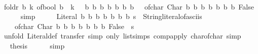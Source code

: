 \begin{isabellebody}
%
\isadelimproof
%
\endisadelimproof
%
\isatagproof
{}\isamarkupfalse%
\ {\isacharminus}{\kern0pt}\isanewline
\ \ \isamarkupfalse%
\ {\isacartoucheopen}foldr\ {\isacharparenleft}{\kern0pt}{\isasymlambda}b\ k{\isachardot}{\kern0pt}\ of{\isacharunderscore}{\kern0pt}bool\ b\ {\isacharplus}{\kern0pt}\ k\ {\isacharasterisk}{\kern0pt}\ {}{\isacharparenright}{\kern0pt}\ {\isacharbrackleft}{\kern0pt}b{}{\isacharcomma}{\kern0pt}\ b{}{\isacharcomma}{\kern0pt}\ b{}{\isacharcomma}{\kern0pt}\ b{}{\isacharcomma}{\kern0pt}\ b{}{\isacharcomma}{\kern0pt}\ b{}{\isacharcomma}{\kern0pt}\ b{}{\isacharbrackright}{\kern0pt}\ {}\ {\isacharequal}{\kern0pt}\ of{\isacharunderscore}{\kern0pt}char\ {\isacharparenleft}{\kern0pt}Char\ b{}\ b{}\ b{}\ b{}\ b{}\ b{}\ b{}\ False{\isacharparenright}{\kern0pt}{\isacartoucheclose}\isanewline
\ \ \ \ \isamarkupfalse%
\ simp\isanewline
\ \ \isamarkupfalse%
\ \isamarkupfalse%
\ {\isacartoucheopen}Literal{\isacharprime}{\kern0pt}\ b{}\ b{}\ b{}\ b{}\ b{}\ b{}\ b{}\ s\ {\isacharequal}{\kern0pt}\ String{\isachardot}{\kern0pt}literal{\isacharunderscore}{\kern0pt}of{\isacharunderscore}{\kern0pt}asciis\isanewline
\ \ \ \ {\isacharbrackleft}{\kern0pt}of{\isacharunderscore}{\kern0pt}char\ {\isacharparenleft}{\kern0pt}Char\ b{}\ b{}\ b{}\ b{}\ b{}\ b{}\ b{}\ False{\isacharparenright}{\kern0pt}{\isacharbrackright}{\kern0pt}\ {\isacharplus}{\kern0pt}\ s{\isacartoucheclose}\isanewline
\ \ \ \ \isamarkupfalse%
\ {\isacharparenleft}{\kern0pt}unfold\ Literal{\isacharprime}{\kern0pt}{\isacharunderscore}{\kern0pt}def{\isacharparenright}{\kern0pt}\ {\isacharparenleft}{\kern0pt}transfer{\isacharcomma}{\kern0pt}\ simp\ only{\isacharcolon}{\kern0pt}\ list{\isachardot}{\kern0pt}simps\ comp{\isacharunderscore}{\kern0pt}apply\ char{\isacharunderscore}{\kern0pt}of{\isacharunderscore}{\kern0pt}char{\isacharcomma}{\kern0pt}\ simp{\isacharparenright}{\kern0pt}\isanewline
\ \ \isamarkupfalse%
\ \isamarkupfalse%
\ {\isacharquery}{\kern0pt}thesis\isanewline
\ \ \ \ \isamarkupfalse%
\ simp\isanewline
{}\isamarkupfalse%
%
\endisatagproof
{\isafoldproof}%
%

\end{isabellebody}
